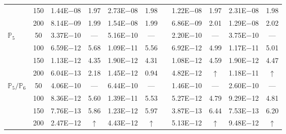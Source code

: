 \begin{table}[H]
{\begin{tabular}{@{}l c c c c c c c c c c@{}}
 & 150 & 1.44E$-$08 & 1.97  & 2.73E$-$08 & 1.98 &  & 1.22E$-$08 & 1.97 & 2.31E$-$08 & 1.98\\
 & 200 & 8.14E$-$09 & 1.99  & 1.54E$-$08 & 1.99 &  & 6.86E$-$09 & 2.01 & 1.29E$-$08 & 2.02\\
\midrule
\multirow{4}{*}{$\mathbb{P}_{5}$}
 & 50 & 3.37E$-$10 & ---  & 5.16E$-$10 & --- &  & 2.20E$-$10 & --- & 3.75E$-$10 & ---\\
 & 100 & 6.59E$-$12 & 5.68  & 1.09E$-$11 & 5.56 &  & 6.92E$-$12 & 4.99 & 1.17E$-$11 & 5.01\\
 & 150 & 1.13E$-$12 & 4.35  & 1.90E$-$12 & 4.31 &  & 1.08E$-$12 & 4.59 & 1.90E$-$12 & 4.47\\
 & 200 & 6.04E$-$13 & 2.18  & 1.45E$-$12 & 0.94 &  & 4.82E$-$12 & $\uparrow$ & 1.18E$-$11 & $\uparrow$\\
\midrule
\multirow{4}{*}{$\mathbb{P}_{5}/\mathbb{P}_{6}$}
 & 50 & 4.06E$-$10 & ---  & 6.44E$-$10 & --- &  & 1.46E$-$10 & --- & 2.60E$-$10 & ---\\
 & 100 & 8.36E$-$12 & 5.60  & 1.39E$-$11 & 5.53 &  & 5.27E$-$12 & 4.79 & 9.29E$-$12 & 4.81\\
 & 150 & 7.76E$-$13 & 5.86  & 1.23E$-$12 & 5.97 &  & 3.87E$-$13 & 6.44 & 7.53E$-$13 & 6.20\\
 & 200 & 2.47E$-$12 & $\uparrow$  & 4.43E$-$12 & $\uparrow$ &  & 5.13E$-$12 & $\uparrow$ & 9.48E$-$12 & $\uparrow$\\
\bottomrule
\end{tabular}}
\label{none}
\end{table}
